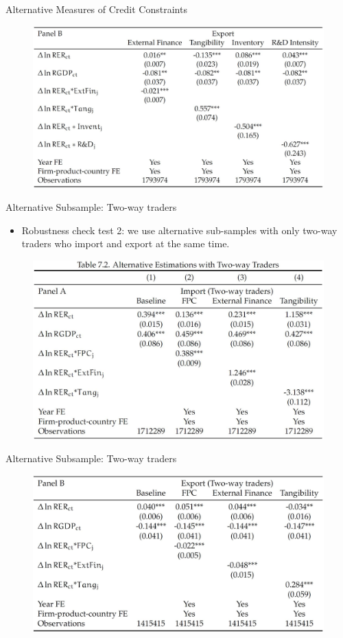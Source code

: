 \documentclass[10pt]{beamer}
\begin{document}
\begin{frame}{Alternative Measures of Credit Constraints}
	\begin{figure}[htbp]
		\centering
		\includegraphics[width=0.9\columnwidth]{Table7.1B.jpg}
		\label{tab7.1B}
	\end{figure}
\end{frame}

\begin{frame}{Alternative Subsample: Two-way traders}
	\begin{itemize}
		\item Robustness check test 2: we use alternative sub-samples with only two-way traders who import and export at the same time.
	\end{itemize}
	\begin{figure}[htbp]
		\centering
		\includegraphics[width=0.85\columnwidth]{Table7.2A.jpg}
		\label{tab7.2A}
	\end{figure}
\end{frame}

\begin{frame}{Alternative Subsample: Two-way traders}
	\begin{figure}[htbp]
		\centering
		\includegraphics[width=0.85\columnwidth]{Table7.2B.jpg}
		\label{tab7.2B}
	\end{figure}
\end{frame}
\end{document}
